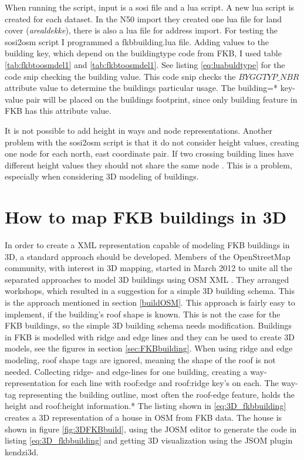 When running the script, input is a sosi file and a lua script. A new lua script is created for each dataset. In the N50 import they created one lua file for land cover (\textit{arealdekke}), there is also a lua file for address import. For testing the sosi2osm script I programmed a fkbbuilding.lua file. Adding values to the building key, which depend on the buildingtype code from FKB, I used table \ref{tab:fkbtoosmdel1} and \ref{tab:fkbtoosmdel1}. See listing \ref{eq:luabuldtype} for the code snip checking the building value. This code snip checks the $BYGGTYP\_NBR$ attribute value to determine the buildings particular usage. The building=* key-value pair will be placed on the buildings footprint, since only building feature in FKB has this attribute value. 

It is not possible to add height in ways and node representations. Another problem with the sosi2osm script is that it do not consider height values, creating one node for each north, east coordinate pair. If two crossing building lines have different height values they should not share the same node \cite{OpenStreetMap2015}. This is a problem, especially when considering 3D modeling of buildings. 


\section{How to map FKB buildings in 3D}
In order to create a XML representation capable of modeling FKB buildings in 3D, a standard approach should be developed. Members of the OpenStreetMap community, with interest in 3D mapping, started in March 2012 to unite all the separated approaches to model 3D buildings using OSM XML \cite{OpenStreetMapm}. They arranged workshops, which resulted in a suggestion for a simple 3D building schema. This is the approach mentioned in section \ref{buildOSM}. This approach is fairly easy to implement, if the building's roof shape is known. This is not the case for the FKB buildings, so the simple 3D building schema needs modification. Buildings in FKB is modelled with ridge and edge lines and they can be used to create 3D models, see the figures in section \ref{sec:FKBbuilding}. When using ridge and edge modeling, roof shape tags are ignored, meaning the shape of the roof is not needed. Collecting ridge- and edge-lines for one building, creating a way-representation for each line with roof:edge and roof:ridge key's on each. The way-tag representing the building outline, most often the roof-edge feature, holds the height and roof:height information.*%
 The listing shown in \ref{eq:3D_fkbbuilding} creates a 3D representation of a house in OSM from FKB data. The house is shown in figure \ref{fig:3DFKBbuild}, using the JOSM editor to generate the code in listing \ref{eq:3D_fkbbuilding} and getting 3D visualization using the JSOM plugin kendzi3d. 

